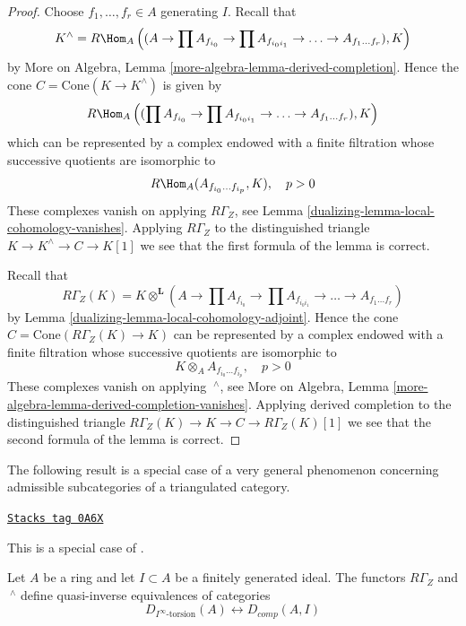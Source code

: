 \begin{proof}

Choose $f_1, \ldots, f_r \in A$ generating $I$. Recall that
$$
K^\wedge = R\Hom_A\left((A \to \prod A_{f_{i_0}}
\to \prod A_{f_{i_0i_1}} \to \ldots \to A_{f_1 \ldots f_r}), K\right)
$$
by More on Algebra, Lemma \ref{more-algebra-lemma-derived-completion}.
Hence the cone $C = \text{Cone}(K \to K^\wedge)$
is given by
$$
R\Hom_A\left((\prod A_{f_{i_0}}
\to \prod A_{f_{i_0i_1}} \to \ldots \to A_{f_1 \ldots f_r}), K\right)
$$
which can be represented by a complex endowed with a finite filtration
whose successive quotients are isomorphic to
$$
R\Hom_A(A_{f_{i_0} \ldots f_{i_p}}, K), \quad p > 0
$$
These complexes vanish on applying $R\Gamma_Z$, see
Lemma \ref{dualizing-lemma-local-cohomology-vanishes}. Applying $R\Gamma_Z$
to the distinguished triangle $K \to K^\wedge \to C \to K[1]$
we see that the first formula of the lemma is correct.

\medskip\noindent
Recall that
$$
R\Gamma_Z(K) =
K \otimes^\mathbf{L} (A \to \prod A_{f_{i_0}}
\to \prod A_{f_{i_0i_1}} \to \ldots \to A_{f_1 \ldots f_r})
$$
by Lemma \ref{dualizing-lemma-local-cohomology-adjoint}.
Hence the cone $C = \text{Cone}(R\Gamma_Z(K) \to K)$
can be represented by a complex endowed with a finite filtration
whose successive quotients are isomorphic to
$$
K \otimes_A A_{f_{i_0} \ldots f_{i_p}}, \quad p > 0
$$
These complexes vanish on applying ${\ }^\wedge$, see
More on Algebra, Lemma \ref{more-algebra-lemma-derived-completion-vanishes}.
Applying derived completion to the distinguished triangle
$R\Gamma_Z(K) \to K \to C \to R\Gamma_Z(K)[1]$
we see that the second formula of the lemma is correct.
\end{proof}

The following result is a special case of a very general phenomenon
concerning admissible subcategories of a triangulated category.

\begin{proposition}
\label{dualizing-proposition-torsion-complete}
\href{https://stacks.math.columbia.edu/tag/0A6X}{\texttt{Stacks tag 0A6X}}

\begin{reference}
This is a special case of \cite[Theorem 1.1]{Porta-Liran-Yekutieli}.
\end{reference}
Let $A$ be a ring and let $I \subset A$ be a finitely generated ideal.
The functors $R\Gamma_Z$ and ${\ }^\wedge$
define quasi-inverse equivalences of categories
$$
D_{I^\infty\text{-torsion}}(A) \leftrightarrow D_{comp}(A, I)
$$
\end{proposition}

